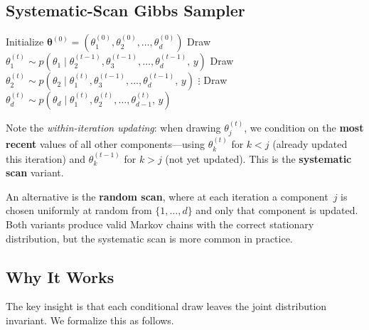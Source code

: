 \documentclass[11pt]{article}
\begin{document}
\subsection{Systematic-Scan Gibbs Sampler}

\begin{algorithm}[H]
\caption{Gibbs Sampling}
\label{alg:gibbs}
\begin{algorithmic}[1]
\State Initialize $\boldsymbol{\theta}^{(0)} = (\theta_1^{(0)}, \theta_2^{(0)}, \ldots, \theta_d^{(0)})$
  \State Draw $\theta_1^{(t)} \sim p(\theta_1 \mid \theta_2^{(t-1)}, \theta_3^{(t-1)}, \ldots, \theta_d^{(t-1)}, \, y)$
  \State Draw $\theta_2^{(t)} \sim p(\theta_2 \mid \theta_1^{(t)}, \theta_3^{(t-1)}, \ldots, \theta_d^{(t-1)}, \, y)$
  \State \hspace{1em} $\vdots$
  \State Draw $\theta_d^{(t)} \sim p(\theta_d \mid \theta_1^{(t)}, \theta_2^{(t)}, \ldots, \theta_{d-1}^{(t)}, \, y)$
\EndFor
\end{algorithmic}
\end{algorithm}

Note the \emph{within-iteration updating}: when drawing $\theta_j^{(t)}$, we condition on the \textbf{most recent} values of all other components---using $\theta_k^{(t)}$ for $k < j$ (already updated this iteration) and $\theta_k^{(t-1)}$ for $k > j$ (not yet updated).  This is the \textbf{systematic scan} variant.

An alternative is the \textbf{random scan}, where at each iteration a component~$j$ is chosen uniformly at random from $\{1, \ldots, d\}$ and only that component is updated.  Both variants produce valid Markov chains with the correct stationary distribution, but the systematic scan is more common in practice.

\subsection{Why It Works}

The key insight is that each conditional draw leaves the joint distribution invariant.  We formalize this as follows.
\end{document}
